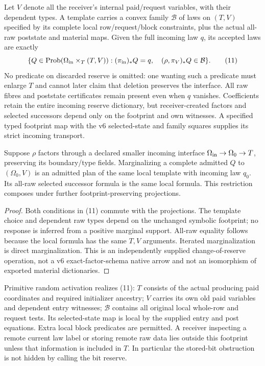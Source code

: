 \documentclass[11pt]{article}
\begin{document}
Let $V$ denote all the receiver's internal paid/request variables, with their dependent types. A template carries a convex family $\mathcal B$ of laws on $(T,V)$ specified by its complete local row/request/block constraints, plus the actual all-raw poststate and material maps. Given the full incoming law $q$, its accepted laws are exactly
\[
 \{Q\in\operatorname{Prob}(\Omega_{\rm in}\times_T(T,V)):
       (\pi_{\rm in})_*Q=q,\quad(\rho,\pi_V)_*Q\in\mathcal B\}.
                                                               \tag{11}
\]
No predicate on discarded reserve is omitted: one wanting such a predicate must enlarge $T$ and cannot later claim that deletion preserves the interface. All raw fibres and poststate certificates remain present even when $q$ vanishes. Coefficients retain the entire incoming reserve dictionary, but receiver-created factors and selected successors depend only on the footprint and own witnesses. A specified typed footprint map with the v6 selected-state and family squares supplies its strict incoming transport.

\begin{proposition}
Suppose $\rho$ factors through a declared smaller incoming interface $\Omega_{\rm in}\to\Omega_0\to T$, preserving its boundary/type fields. Marginalizing a complete admitted $Q$ to $(\Omega_0,V)$ is an admitted plan of the same local template with incoming law $q_0$. Its all-raw selected successor formula is the same local formula. This restriction composes under further footprint-preserving projections.
\end{proposition}
\begin{proof}
Both conditions in (11) commute with the projections. The template choice and dependent raw types depend on the unchanged symbolic footprint; no response is inferred from a positive marginal support. All-raw equality follows because the local formula has the same $T,V$ arguments. Iterated marginalization is direct marginalization. This is an independently supplied change-of-reserve operation, not a v6 exact-factor-schema native arrow and not an isomorphism of exported material dictionaries.\end{proof}

Primitive random activation realizes (11): $T$ consists of the actual producing paid coordinates and required initializer ancestry; $V$ carries its own old paid variables and dependent entry witnesses; $\mathcal B$ contains all original local whole-row and request tests. Its selected-state map is local by the supplied entry and post equations. Extra local block predicates are permitted. A receiver inspecting a remote current law label or storing remote raw data lies outside this footprint unless that information is included in $T$. In particular the stored-bit obstruction is not hidden by calling the bit reserve.
\end{document}

